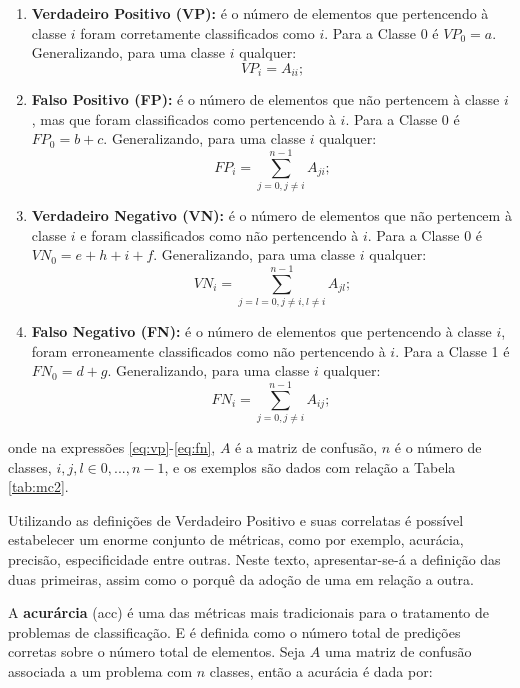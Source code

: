 \begin{enumerate}
\item {\bf Verdadeiro Positivo (VP):} é o número de elementos que pertencendo à classe $i$ foram corretamente classificados como $i$. Para a Classe 0 é $VP_0=a$. Generalizando, para uma classe $i$ qualquer:
\begin{equation}\label{eq:vp}
VP_i = A_{ii}\mbox{;}
\end{equation}
\item {\bf Falso Positivo (FP):} é o número de elementos que não pertencem à classe $i$, mas que foram classificados como pertencendo à $i$. Para a Classe 0 é $FP_0=b+c$. Generalizando, para uma classe $i$ qualquer:
\begin{equation}\label{eq:fp}
FP_i = \sum_{j=0,j\ne{i}}^{n-1}A_{ji}\mbox{;}
\end{equation}
\item {\bf Verdadeiro Negativo (VN):} é o número de elementos que não pertencem à classe $i$ e foram classificados como não pertencendo à $i$. Para a Classe 0 é $VN_0=e+h+i+f$. Generalizando, para uma classe $i$ qualquer:
\begin{equation}\label{eq:vn}
VN_i = \sum_{j=l=0,j\ne{i}, l\ne{i}}^{n-1}A_{jl}\mbox{;}
\end{equation}
\item {\bf Falso Negativo (FN):} é o número de elementos que pertencendo à classe $i$, foram erroneamente classificados como não pertencendo à $i$. Para a Classe 1 é $FN_0=d+g$. Generalizando, para uma classe $i$ qualquer:
\begin{equation}\label{eq:fn}
FN_i = \sum_{j=0,j\ne{i}}^{n-1}A_{ij}\mbox{;}~
\end{equation}
\end{enumerate}

onde na expressões \eqref{eq:vp}-\eqref{eq:fn}, $A$ é a matriz de confusão, $n$ é o número de classes, $i,j,l\in{0,...,n-1}$, e os exemplos são dados com relação a Tabela \ref{tab:mc2}.

Utilizando as definições de Verdadeiro Positivo e suas correlatas é possível estabelecer um enorme conjunto de métricas, como por exemplo, acurácia, precisão, especificidade entre outras. Neste texto, apresentar-se-á a definição das duas primeiras, assim como o porquê da adoção de uma em relação a outra.

A {\bf acurárcia} (acc) é uma das métricas mais tradicionais para o tratamento de problemas de classificação. E é definida como o número total de predições corretas sobre o número total de elementos. Seja $A$ uma matriz de confusão associada a um problema com $n$ classes, então a acurácia é dada por:

